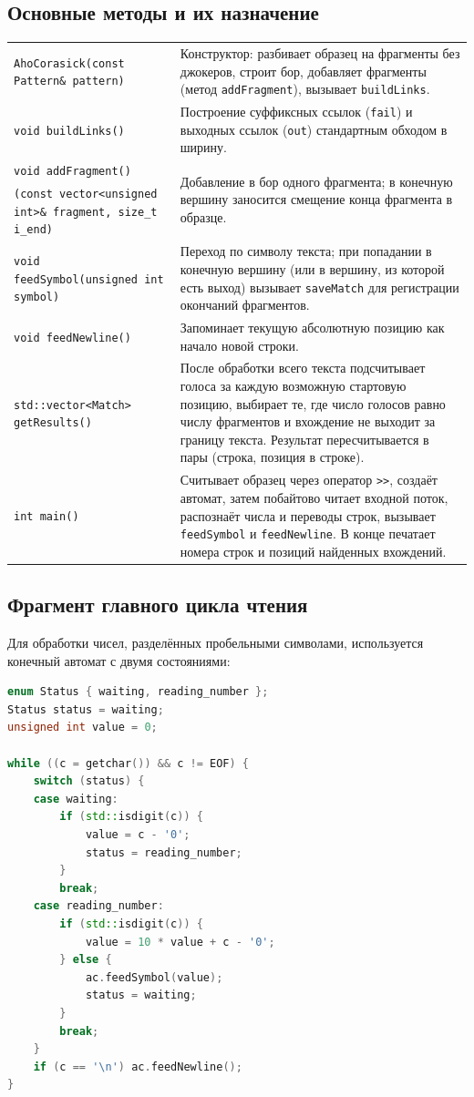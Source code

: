 \subsection{Основные методы и их назначение}
\begin{longtable}{|p{7.5cm}|p{7.5cm}|}
\hline
\rowcolor{lightgray}
\multicolumn{2}{|c|}{\texttt{main.cpp}} \\
\hline
\texttt{AhoCorasick(const Pattern\& pattern)} &
Конструктор: разбивает образец на фрагменты без джокеров, строит бор,
добавляет фрагменты (метод \texttt{addFragment}), вызывает
\texttt{buildLinks}. \\
\hline
\texttt{void buildLinks()} &
Построение суффиксных ссылок (\texttt{fail}) и выходных ссылок
(\texttt{out}) стандартным обходом в ширину. \\
\hline
\texttt{void addFragment()} & \multirow{2}{=}{Добавление в бор одного фрагмента; в конечную вершину заносится смещение конца фрагмента в образце.} \\
\texttt{(const vector<unsigned int>\& fragment, size\_t i\_end)} & \\
\hline
\texttt{void feedSymbol(unsigned int symbol)} &
Переход по символу текста; при попадании в конечную вершину (или в
вершину, из которой есть выход) вызывает \texttt{saveMatch} для
регистрации окончаний фрагментов. \\
\hline
\texttt{void feedNewline()} &
Запоминает текущую абсолютную позицию как начало новой строки. \\
\hline
\texttt{std::vector<Match> getResults()} &
После обработки всего текста подсчитывает голоса за каждую возможную
стартовую позицию, выбирает те, где число голосов равно числу
фрагментов и вхождение не выходит за границу текста. Результат
пересчитывается в пары (строка, позиция в строке). \\
\hline
\texttt{int main()} &
Считывает образец через оператор \texttt{>>}, создаёт автомат, затем
побайтово читает входной поток, распознаёт числа и переводы строк,
вызывает \texttt{feedSymbol} и \texttt{feedNewline}. В конце печатает
номера строк и позиций найденных вхождений. \\
\hline
\end{longtable}

\subsection{Фрагмент главного цикла чтения}
Для обработки чисел, разделённых пробельными символами, используется
конечный автомат с двумя состояниями:
\begin{lstlisting}[language=C++]
enum Status { waiting, reading_number };
Status status = waiting;
unsigned int value = 0;

while ((c = getchar()) && c != EOF) {
    switch (status) {
    case waiting:
        if (std::isdigit(c)) {
            value = c - '0';
            status = reading_number;
        }
        break;
    case reading_number:
        if (std::isdigit(c)) {
            value = 10 * value + c - '0';
        } else {
            ac.feedSymbol(value);
            status = waiting;
        }
        break;
    }
    if (c == '\n') ac.feedNewline();
}
\end{lstlisting}
\pagebreak

